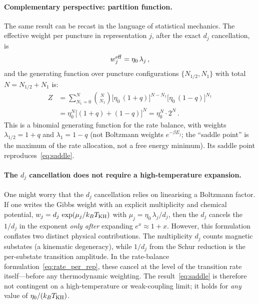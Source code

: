 \documentclass[aps,prd,twocolumn,10pt,superscriptaddress,nofootinbib]{revtex4-2}
\begin{document}
\paragraph{Complementary perspective: partition function.}

The same result can be recast in the language of statistical
mechanics.  The effective weight per puncture in representation
$j$, after the exact $d_j$ cancellation, is
\begin{equation}
w_j^{\rm eff} = \eta_0\,\lambda_j\,,
\label{eq:gibbs_weight}
\end{equation}
and the generating function over puncture configurations
$\{N_{1/2}, N_1\}$ with total $N = N_{1/2} + N_1$ is:
\begin{align}
Z &= \sum_{N_1=0}^{N} \binom{N}{N_1}
  \bigl[\eta_0\,(1+q)\bigr]^{N-N_1}
  \bigl[\eta_0\,(1-q)\bigr]^{N_1}
\nonumber \\
&= \eta_0^N\bigl[(1+q) + (1-q)\bigr]^N
= \eta_0^N \cdot 2^N\,.
\label{eq:Z}
\end{align}
This is a binomial generating function for the rate balance,
with weights $\lambda_{1/2} = 1+q$ and $\lambda_1 = 1-q$ (not
Boltzmann weights $e^{-\beta E_j}$; the ``saddle point'' is the
maximum of the rate allocation, not a free energy minimum).
Its saddle point reproduces~\eqref{eq:saddle}.

\paragraph{The $d_j$ cancellation does not require a
high-temperature expansion.}

One might worry that the $d_j$ cancellation relies on
linearising a Boltzmann factor.  If one writes the Gibbs weight
with an explicit multiplicity and chemical potential,
$w_j = d_j\,\exp(\mu_j/k_B T_{\rm KH})$ with
$\mu_j = \eta_0\,\lambda_j/d_j$, then the $d_j$ cancels
the $1/d_j$ in the exponent \emph{only after} expanding
$e^x \approx 1 + x$.  However, this formulation conflates two
distinct physical contributions.  The multiplicity $d_j$ counts
magnetic substates (a kinematic degeneracy), while $1/d_j$ from
the Schur reduction is the per-substate transition amplitude.
In the rate-balance formulation~\eqref{eq:rate_per_rep}, these
cancel at the level of the transition rate itself---before any
thermodynamic weighting.  The result~\eqref{eq:saddle} is
therefore not contingent on a high-temperature or weak-coupling
limit; it holds for \emph{any} value of $\eta_0/(k_B T_{\rm KH})$.
\end{document}
